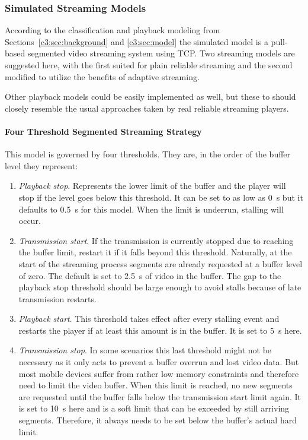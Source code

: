 \subsubsection{Simulated Streaming Models}

According to the classification and playback modeling from Sections~\ref{c3:sec:background} and \ref{c3:sec:model} the simulated model is a pull-based segmented video streaming system using \gls{TCP}. Two streaming models are suggested here, with the first suited for plain reliable streaming and the second modified to utilize the benefits of adaptive streaming.

Other playback models could be easily implemented as well, but these to should closely resemble the usual approaches taken by real reliable streaming players.


\paragraph{Four Threshold Segmented Streaming Strategy}

This model is governed by four thresholds. They are, in the order of the buffer level they represent:

\begin{enumerate}
	\item \textit{Playback stop}. Represents the lower limit of the buffer and the player will stop if the level goes below this threshold. It can be set to as low as \SI{0}{\second} but it defaults to \SI{0.5}{\second} for this model. When the limit is underrun, stalling will occur.

	\item \textit{Transmission start}. If the transmission is currently stopped due to reaching the buffer limit, restart it if it falls beyond this threshold. Naturally, at the start of the streaming process segments are already requested at a buffer level of zero. The default is set to \SI{2.5}{\second} of video in the buffer. The gap to the playback stop threshold should be large enough to avoid stalls because of late transmission restarts.

	\item \textit{Playback start}. This threshold takes effect after every stalling event and restarts the player if at least this amount is in the buffer. It is set to \SI{5}{\second} here.

	\item \textit{Transmission stop}. In some scenarios this last threshold might not be necessary as it only acts to prevent a buffer overrun and lost video data. But most mobile devices suffer from rather low memory constraints and therefore need to limit the video buffer. When this limit is reached, no new segments are requested until the buffer falls below the transmission start limit again. It is set to \SI{10}{\second} here and is a soft limit that can be exceeded by still arriving segments. Therefore, it always needs to be set below the buffer's actual hard limit.
\end{enumerate}


